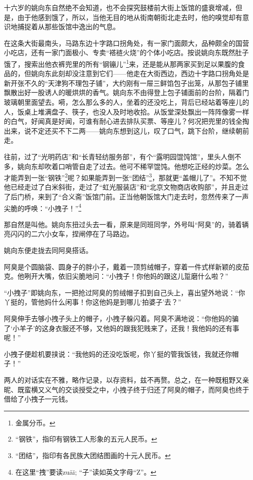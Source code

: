 \par 十六岁的姚向东自然绝不会知道，也不会探究鼓楼前大街上饭馆的盛衰增减，但是，由于他感到饿了，所以，当他无目的地从街南朝街北走去时，他的嗅觉却有意识地捕捉着从那些饭馆中逸出的气息。
\par 在这条大街最南头，马路东边十字路口拐角处，有一家门面颇大，品种颇全的国营小吃店，还有一家门面极小、专卖“褡裢火烧”的个体小吃店。按说姚向东既然肚子饿了，搜索出他衣裤兜里的所有“钢镚儿”\footnote{金属分币。}来，还是能从那两家买到足以果腹的食品的，但姚向东此刻却没注意到它们——他走在大街西边，西边十字路口拐角处是新开张不久的“天津狗不理包子铺”，大约刚有一屉三鲜馅包子出笼，从那包子铺里飘散出好一股诱人的暖烘烘的香气。姚向东不由得登上包子铺面前的台阶，隔着门玻璃朝里面望去。嗬，怎么那么多的人，坐着的还没吃上，背后已经站着等座儿的人，饭桌上堆满盘子、筷子，也没人及时地收拾。从饭堂深处飘出一阵阵像雾一样的白气，好闻真是好闻，可谁有耐心进去排队买票、等座儿？何况把兜里的钱全掏出来，说不定还买不下二两——姚向东想到这儿，叹了口气，跳下台阶，继续朝前走。
\par 往前，过了“光明药店”和“长青轻纺服务部”，有个“露明园馄饨馆”，里头人倒不多，姚向东却吹着口哨管自走了过去。他可不稀罕馄饨。他想吃正经的炒菜。怎么才能弄到一张“钢铁”\footnote{“钢铁”，指印有钢铁工人形象的五元人民币。}呢？如果能弄到一张“团结”\footnote{“团结”，指印有各民族大团结图画的十元人民币。}，那就更“盖帽儿了”。不知不觉他已经走过了白米斜街，走过了“虹光服装店”和“北京文物商店收购部”，并且走过了后门桥，来到了“合义斋”饭馆门前。正当他朝饭馆大门走去时，忽然传来了一声尖脆的呼唤：“小拽子！”\footnote{在这里“拽”要读zuāi; “子”读如英文字母“Z”。}
\par 那自然是叫他。姚向东扭过头去一看，原来是同班同学，外号叫“阿臭”的，骑着辆亮闪闪的二六小女车，捏闸停在了马路边。
\par 姚向东便走拢去同阿臭搭话。
\par 阿臭是个圆脑袋、圆身子的胖小子，戴着一顶剪绒帽子，穿着一件式样新颖的皮茄克。他咧开大嘴，依旧尖脆地问：“小拽子！你他妈的跟这儿踅磨什么啦？”
\par “小拽子”即姚向东，一把抢过阿臭的剪绒帽子扣到自己头上，喜出望外地说：“你丫挺的，管他妈什么闲事！你这他妈是到哪儿‘拍婆子’去？”
\par 阿臭伸手去够小拽子头上的帽子，小拽子躲闪着。阿臭不满地说：“你他妈的骗了‘小羊子’的这身衣服还不够，又他妈的跟我犯贱来了，还我！我他妈的还有事呢！”
\par 小拽子便趁机要挟说：“我他妈的还没吃饭呢，你丫挺的管我饭钱，我就还你帽子！”
\par 两人的对话实在不雅，略作记录，以存资料，兹不再赘。总之，在一种既粗野又亲昵、既蛮横又义气的交谈授受之中，小拽子终于归还了阿臭的帽子，而阿臭也终于借给了小拽子一元钱。
